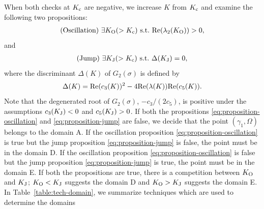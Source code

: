 When both checks at $K_{\rm c}$ are negative, 
we increase $K$ from $K_{\rm c}$ and examine the following two propositions:
\begin{align}
  \mathrm{(Oscillation) }\ 
  \exists K_{\rm O} (>K_{\rm c})\ 
  \mathrm{ s.t. }\ 
  {\rm Re}(\lambda_{2}(K_{\rm O}))>0,
  \label{eq:proposition-oscillation}
\end{align}
and
\begin{align}
  \mathrm{(Jump) }\ 
  \exists K_{\rm J} (>K_{\rm c})\ 
  \mathrm{ s.t. }\ 
  \Delta(K_{\rm J}) = 0,
  \label{eq:proposition-jump}
\end{align}
where the discriminant $\Delta(K)$ of $G_{2}(\sigma)$ is defined by
\begin{align}
  \Delta(K)
  = {\rm Re}(c_{3}(K))^{2} - 4{\rm Re}(\lambda(K)){\rm Re}(c_{5}(K)).
\end{align}
Note that the degenerated root of $G_{2}(\sigma)$, $-c_{3}/(2c_{5})$,
is positive under the assumptions $c_{3}(K_{\rm J})<0$ and $c_{5}(K_{\rm J})>0$.
If both the propositions \eqref{eq:proposition-oscillation}
and \eqref{eq:proposition-jump} are false, we decide that the point
$(\gamma_{1},\Omega)$ belongs to the domain A.
If the oscillation proposition \eqref{eq:proposition-oscillation}
is true but the jump proposition \eqref{eq:proposition-jump} is false,
the point must be in the domain D.
If the oscillation proposition \eqref{eq:proposition-oscillation}
is false but the jump proposition \eqref{eq:proposition-jump} is true,
the point must be in the domain E.
If both the propositions are true, there is a competition
between $K_{\rm O}$ and $K_{\rm J}$; $K_{\rm O}<K_{\rm J}$ suggests the domain D
and $K_{\rm O}>K_{\rm J}$ suggests the domain E.
  In Table~\ref{table:tech-domain}, 
  we summarize techniques which are used to determine the domains

